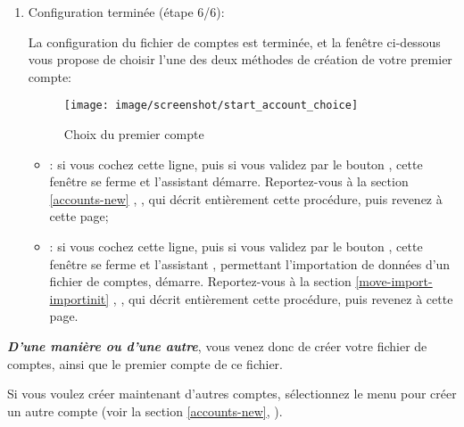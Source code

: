 \begin{enumerate}
	\item Configuration terminée (étape 6/6):\par
	La configuration du fichier de comptes est terminée, et la fenêtre ci-dessous vous propose de choisir l'une des deux méthodes de création de votre premier compte:

\vspace{2mm}

\begin{figure}[htbp]
\begin{center}
\texttt{[image: image/screenshot/start\_account\_choice]}
\end{center}
\caption{Choix du premier compte}
\label{start_account_choice}
\end{figure}

		\begin{itemize}
			\item {}: si vous cochez cette ligne, puis si vous validez par le bouton , cette fenêtre se ferme et l'assistant  démarre. Reportez-vous à la section \vref{accounts-new}%
			, , qui décrit entièrement cette procédure, puis revenez à cette page;

			\item {}: si vous cochez cette ligne, puis si vous validez par le bouton , cette fenêtre se ferme et l'assistant , permettant l'importation de données d'un fichier de comptes, démarre. Reportez-vous à la section \vref{move-import-importinit}%
			, , qui décrit entièrement cette procédure, puis revenez à cette page.
		\end{itemize}
\end{enumerate}

\label{start-newfile-end}

\textit{\textbf{D'une manière ou d'une autre}}, vous venez donc de créer votre fichier de comptes, ainsi que le premier compte de ce fichier. 

Si vous voulez créer maintenant d'autres comptes, sélectionnez le menu  pour créer un autre compte (voir la section \vref{accounts-new}, ).


